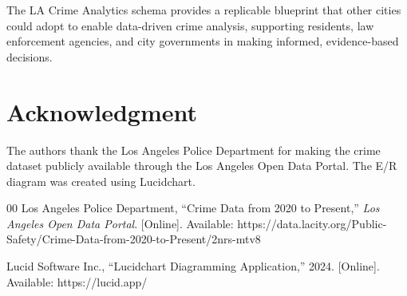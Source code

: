 \documentclass[conference]{IEEEtran}
\begin{document}
The LA Crime Analytics schema provides a replicable blueprint that other cities could adopt to enable data-driven crime analysis, supporting residents, law enforcement agencies, and city governments in making informed, evidence-based decisions.

\section*{Acknowledgment}

The authors thank the Los Angeles Police Department for making the crime dataset publicly available through the Los Angeles Open Data Portal. The E/R diagram was created using Lucidchart.

\begin{thebibliography}{00}
 Los Angeles Police Department, ``Crime Data from 2020 to Present,'' \textit{Los Angeles Open Data Portal}. [Online]. Available: https://data.lacity.org/Public-Safety/Crime-Data-from-2020-to-Present/2nrs-mtv8

 Lucid Software Inc., ``Lucidchart Diagramming Application,'' 2024. [Online]. Available: https://lucid.app/
\end{thebibliography}
\end{document}

